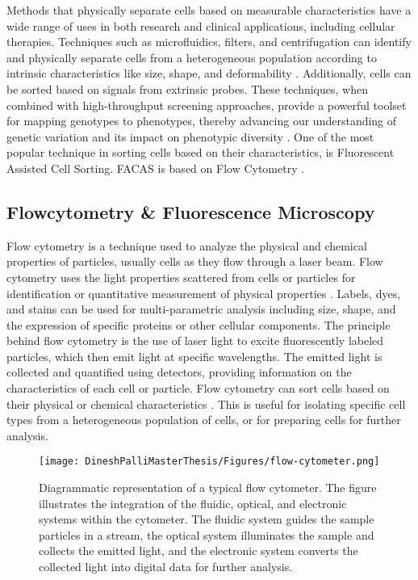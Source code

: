 \documentclass[12pt,a4paper]{article}
\begin{document}
Methods that physically separate cells based on measurable characteristics have a wide range of uses in both research and clinical applications, including cellular therapies. Techniques such as microfluidics, filters, and centrifugation can identify and physically separate cells from a heterogeneous population according to intrinsic characteristics like size, shape, and deformability \cite{https://doi.org/10.1002/bit.22833}. Additionally, cells can be sorted based on signals from extrinsic probes. These techniques, when combined with high-throughput screening approaches, provide a powerful toolset for mapping genotypes to phenotypes, thereby advancing our understanding of genetic variation and its impact on phenotypic diversity \cite{vandereyken_sifrim_thienpont_voet_2023}. One of the most popular technique in sorting cells based on their characteristics, is Fluorescent Assisted Cell Sorting. FACAS is based on Flow Cytometry \cite{liao_makris_luo_2016}.

\subsection{Flowcytometry \& Fluorescence Microscopy}

Flow cytometry is a technique used to analyze the physical and chemical properties of particles, usually cells as they flow through a laser beam. Flow cytometry uses the light properties scattered from cells or particles for identification or quantitative measurement of physical properties \cite{mckinnon_2018}. Labels, dyes, and stains can be used for multi-parametric analysis including size, shape, and the expression of specific proteins or other cellular components. The principle behind flow cytometry is the use of laser light to excite fluorescently labeled particles, which then emit light at specific wavelengths. The emitted light is collected and quantified using detectors, providing information on the characteristics of each cell or particle. Flow cytometry can sort cells based on their physical or chemical characteristics \cite{mckinnon_2018}. This is useful for isolating specific cell types from a heterogeneous population of cells, or for preparing cells for further analysis.

\begin{figure}
  \centering
  \texttt{[image: DineshPalliMasterThesis/Figures/flow-cytometer.png]}
  \caption{Diagrammatic representation of a typical flow cytometer. The figure illustrates the integration of the fluidic, optical, and electronic systems within the cytometer. The fluidic system guides the sample particles in a stream, the optical system illuminates the sample and collects the emitted light, and the electronic system converts the collected light into digital data for further analysis. \cite{aatbioFundamentalsFlow}}
  \label{flowcytometry}
\end{figure}
\end{document}
